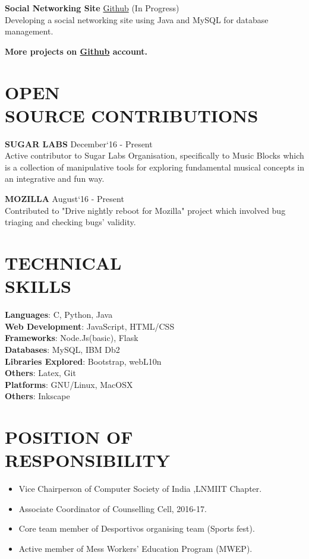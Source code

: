 \documentclass[margin]{res}
\begin{document}
\begin{resume}
  {\textbf{Social Networking Site}} \href{https://github.com/ShubhamSetia/SocialNetworkingSite}{Github} \hfill (In Progress)\\
  Developing a social networking site using Java and MySQL for database management.
  


  \textbf{More projects on \href{https://github.com/Tabs16}{Github} account.}

\section{OPEN \\ SOURCE CONTRIBUTIONS}
	{\textbf{SUGAR LABS}} \hfill December`16 - Present\\
 	Active contributor to Sugar Labs Organisation, specifically to Music Blocks which is a collection of manipulative tools for exploring fundamental musical concepts in an integrative and fun way.

 	{\textbf{MOZILLA}} \hfill August`16 - Present\\
 	Contributed to "Drive nightly reboot for Mozilla" project which involved bug triaging and checking bugs' validity.
 	




\section{TECHNICAL \\ SKILLS}

  {\textbf{Languages}:} C, Python, Java\\
  {\textbf{Web Development}:} JavaScript, HTML/CSS\\
  {\textbf{Frameworks}:} Node.Js(basic), Flask\\
  {\textbf{Databases}:} MySQL, IBM Db2\\
  {\textbf{Libraries Explored}:} Bootstrap, webL10n\\
  {\textbf{Others}:} Latex, Git\\
  {\textbf{Platforms}:} GNU/Linux, MacOSX\\
  {\textbf{Others}:} Inkscape\\

\section{POSITION OF RESPONSIBILITY }
	\begin{itemize}
		\item Vice Chairperson of Computer Society of India ,LNMIIT Chapter.
		\item Associate Coordinator of Counselling Cell, 2016-17.	
  		\item Core team member of Desportivos organising team (Sports fest).
  		\item Active member of Mess Workers' Education Program (MWEP).
	\end{itemize}


\end{resume}
\end{document}
